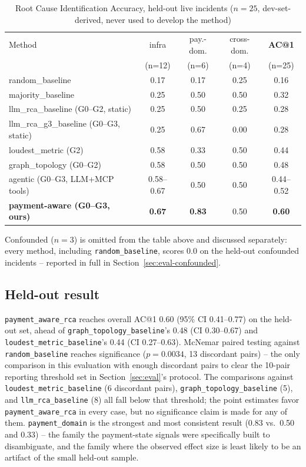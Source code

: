 \documentclass[conference]{IEEEtran}
\begin{document}
\begin{table}[h]
\centering
\caption{Root Cause Identification Accuracy, held-out live incidents
($n=25$, dev-set-derived, never used to develop the method)}
\begin{tabular}{lcccc}
\toprule
Method & infra & pay.-dom. & cross-dom. & \textbf{AC@1} \\
 & (n=12) & (n=6) & (n=4) & (n=25) \\
\midrule
random\_baseline           & 0.17 & 0.17 & 0.25 & 0.16 \\
majority\_baseline         & 0.25 & 0.50 & 0.50 & 0.32 \\
llm\_rca\_baseline (G0--G2, static) & 0.25 & 0.50 & 0.25 & 0.28 \\
llm\_rca\_g3\_baseline (G0--G3, static) & 0.25 & 0.67 & 0.00 & 0.28 \\
loudest\_metric (G2)        & 0.58 & 0.33 & 0.50 & 0.44 \\
graph\_topology (G0--G2)    & 0.58 & 0.50 & 0.50 & 0.48 \\
agentic (G0--G3, LLM+MCP tools) & 0.58--0.67 & 0.50 & 0.50 & 0.44--0.52 \\
\textbf{payment-aware (G0--G3, ours)} & \textbf{0.67} & \textbf{0.83} & 0.50 & \textbf{0.60} \\
\bottomrule
\end{tabular}
\end{table}

Confounded ($n=3$) is omitted from the table above and discussed
separately: every method, including \texttt{random\_baseline}, scores 0.0
on the held-out confounded incidents -- reported in full in
Section~\ref{sec:eval-confounded}.

\subsection{Held-out result}
\texttt{payment\_aware\_rca} reaches overall AC@1 0.60 (95\% CI
0.41--0.77) on the held-out set, ahead of \texttt{graph\_topology\_baseline}'s
0.48 (CI 0.30--0.67) and \texttt{loudest\_metric\_baseline}'s 0.44 (CI
0.27--0.63). McNemar paired testing against \texttt{random\_baseline}
reaches significance ($p=0.0034$, 13 discordant pairs) -- the only
comparison in this evaluation with enough discordant pairs to clear the
10-pair reporting threshold set in Section~\ref{sec:eval}'s protocol. The
comparisons against \texttt{loudest\_metric\_baseline} (6 discordant
pairs), \texttt{graph\_topology\_baseline} (5), and \texttt{llm\_rca\_baseline}
(8) all fall below that threshold; the point estimates favor
\texttt{payment\_aware\_rca} in every case, but no significance claim is
made for any of them. \texttt{payment\_domain} is the strongest and most
consistent result (0.83 vs.\ 0.50 and 0.33) -- the family the payment-state
signals were specifically built to disambiguate, and the family where the
observed effect size is least likely to be an artifact of the small held-out
sample.
\end{document}
